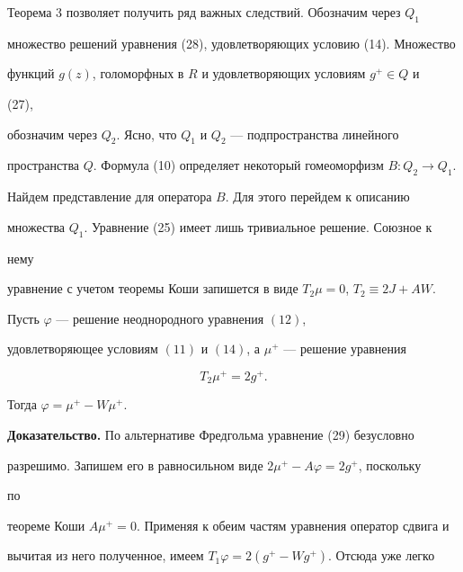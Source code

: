  


Теорема 3 позволяет получить ряд важных следствий. Обозначим через $Q_1$ 


множество решений уравнения (28), удовлетворяющих условию (14). Множество 


функций $g(z)$, голоморфных в $R$ и удовлетворяющих условиям $g^+\in Q$ и 


(27), 


обозначим через $Q_2$. Ясно, что $Q_1$ и $Q_2$ --- подпространства линейного 


пространства $Q$. Формула (10) определяет некоторый гомеоморфизм $B:Q_2\to 


Q_1$. 


Найдем представление для оператора $B$. Для этого перейдем к описанию 


множества $Q_1$. Уравнение (25) имеет лишь тривиальное решение. Союзное к 


нему 


уравнение с учетом теоремы Коши запишется в виде $T_2\mu=0$, $T_2\equiv 


2J+AW$. 


 


 


\begin{thm} 


Пусть $\varphi$ --- решение неоднородного уравнения $(12)$, 


удовлетворяющее условиям $(11)$ и $(14)$, а $\mu^+$ --- решение уравнения 


\begin{equation} 


T_2\mu^+=2g^+. 


\end{equation} 


Тогда $\varphi=\mu^+-W\mu^+$. 


\end{thm} 


 


 


{\bf Доказательство.} По альтернативе Фредгольма уравнение (29) безусловно 


разрешимо. Запишем его в равносильном виде $2\mu^+-A\varphi=2g^+$, поскольку 


по 


теореме Коши $A\mu^+=0$. Применяя к обеим частям уравнения оператор сдвига и 


вычитая из него полученное, имеем $T_1\varphi=2(g^+-Wg^+)$. Отсюда уже легко 


